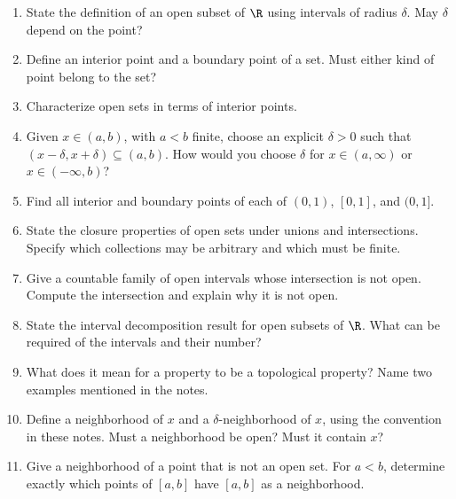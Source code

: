 \begin{enumerate}[resume]
  \item State the definition of an open subset of \(\R\) using intervals
    of radius \(\delta\). May \(\delta\) depend on the point?

  \item Define an interior point and a boundary point of a set.
    Must either kind of point belong to the set?

  \item Characterize open sets in terms of interior points.

  \item Given \(x\in(a,b)\), with \(a<b\) finite, choose an explicit
    \(\delta>0\) such that \((x-\delta,x+\delta)\subseteq(a,b)\).
    How would you choose \(\delta\) for \(x\in(a,\infty)\) or
    \(x\in(-\infty,b)\)?

  \item Find all interior and boundary points of each of
    \((0,1)\), \([0,1]\), and \((0,1]\).

  \item State the closure properties of open sets under unions and
    intersections. Specify which collections may be arbitrary and which
    must be finite.

  \item Give a countable family of open intervals whose intersection is
    not open. Compute the intersection and explain why it is not open.

  \item State the interval decomposition result for open subsets of
    \(\R\). What can be required of the intervals and their number?

  \item What does it mean for a property to be a topological property?
    Name two examples mentioned in the notes.

  \item Define a neighborhood of \(x\) and a \(\delta\)-neighborhood of
    \(x\), using the convention in these notes. Must a neighborhood
    be open? Must it contain \(x\)?

  \item Give a neighborhood of a point that is not an open set.
    For \(a<b\), determine exactly which points of \([a,b]\) have
    \([a,b]\) as a neighborhood.


\end{enumerate}
